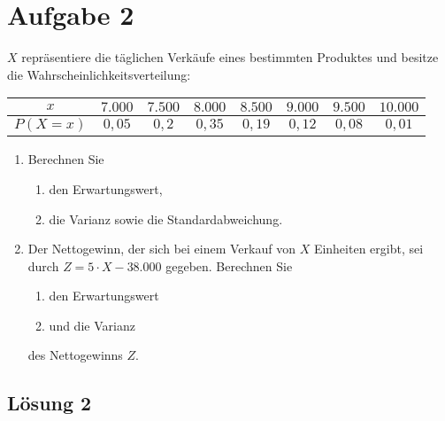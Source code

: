 \documentclass[main.tex]{subfiles}
\begin{document}
\section{Aufgabe 2}
$X$ repräsentiere die täglichen Verkäufe eines bestimmten Produktes und besitze die Wahrscheinlichkeitsverteilung:
\begin{center}
\begin{tabular}{c|c|c|c|c|c|c|c}
	$x$        & $7.000$ & $7.500$ & $8.000$ & $8.500$ & $9.000$ & $9.500$ & $10.000$ \\ 
	\hline
	$P(X = x)$ &  $0,05$ &   $0,2$ &  $0,35$ &  $0,19$ &  $0,12$ &  $0,08$ &   $0,01$ \\
\end{tabular}
\end{center}
\begin{enumerate}
\item Berechnen Sie  
\begin{enumerate}
  	\item den Erwartungswert,  
  	\item die Varianz sowie die Standardabweichung.
\end{enumerate}
\item Der Nettogewinn, der sich bei einem Verkauf von $X$ Einheiten ergibt, sei durch $Z = 5 \cdot X - 38.000$ gegeben. Berechnen Sie 
\begin{enumerate}
  	\item den Erwartungswert  
  	\item und die Varianz
\end{enumerate}
des Nettogewinns $Z$.
\end{enumerate}

\subsection{Lösung 2}
\end{document}
